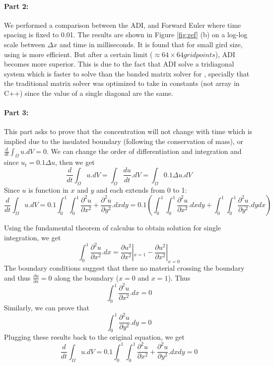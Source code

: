 \paragraph{Part 2:}
We performed a comparison between the ADI, \protect{\cn} and Forward Euler where time spacing is fixed to 0.01. The results are shown in Figure \ref{fig:ref} (b) on a log-log scale between $\Delta x$ and time in milliseconds. It is found that for small gird size, using \protect{\cn} is more efficient. But after a certain limit ($\approx 64 \times 64 grid points$), ADI becomes more superior. This is due to the fact that ADI solve a tridiagonal system which is faster to solve than the banded matrix solver for \protect{\cn}, specially that the traditional matrix solver was optimized to take in constants (not array in C++) since the value of a single diagonal are the same. 


\paragraph{Part 3:}
This part asks to prove that the concentration will not change with time which is implied due to the insulated boundary (following the conservation of mass), or $\frac{d}{dt} \int_{\Omega} u.dV=0$. We can change the order of differentiation and integration and since $u_{t}=0.1\Delta u$, then we get
$$
\frac{d}{dt} \int_{\Omega} u.dV= \int_{\Omega} \frac{d u}{dt}.dV  = \int_{\Omega} 0.1\Delta u.dV
$$
Since $u$  is function in $x$ and $y$ and each extends from 0 to 1:
$$
\frac{d}{dt} \int_{\Omega} u.dV =  0.1 \int_{0}^{1}\int_{0}^{1}\frac{\partial^{2}u}{\partial x^{2}} + \frac{\partial^{2}u}{\partial y^{2}}.dxdy  = 0.1 (\int_{0}^{1}\int_{0}^{1}\frac{\partial^{2}u}{\partial x^{2}}.dxdy + \int_{0}^{1}\int_{0}^{1}\frac{\partial^{2}u}{\partial y^{2}} .dydx)
$$

Using the fundamental theorem of calculus to obtain solution for single integration, we get 
$$
\int_{0}^{1}\frac{\partial^{2}u}{\partial x^{2}}.dx = \frac{\partial u^2}{\partial x^2}|_{x=1} - \frac{\partial u^2}{\partial x^2}|_{x=0}
$$
The boundary conditions suggest that there no material crossing the boundary and thus $\frac{\partial u}{\partial x}=0$ along the boundary ($x=0$ and $x=1$). Thus 
$$
\int_{0}^{1}\frac{\partial^{2}u}{\partial x^{2}}.dx = 0
$$
Similarly, we can prove that
$$
\int_{0}^{1}\frac{\partial^{2}u}{\partial y^{2}}.dy = 0
$$
Plugging these results back to the original equation, we get
$$
\frac{d}{dt} \int_{\Omega} u.dV =  0.1 \int_{0}^{1}\int_{0}^{1}\frac{\partial^{2}u}{\partial x^{2}} + \frac{\partial^{2}u}{\partial y^{2}}.dxdy = 0
$$

